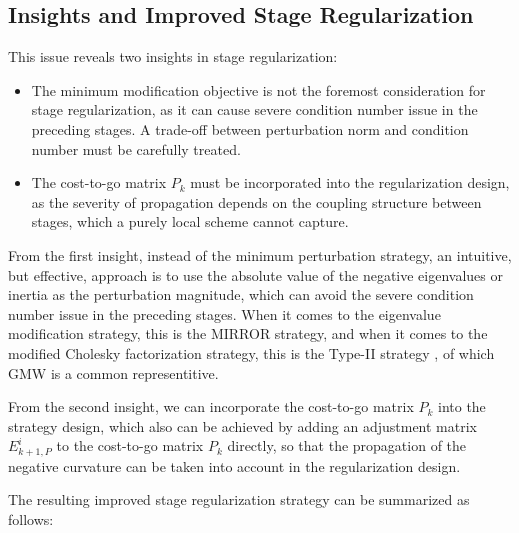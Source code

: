 \documentclass[class=scrbook, crop=false]{standalone}
\begin{document}
\subsection{Insights and Improved Stage Regularization}
This issue reveals two insights in stage regularization:
\begin{itemize}
    \item The minimum modification objective \cite{fangModifiedCholeskyAlgorithms2007} is not the foremost consideration for stage regularization, 
    as it can cause severe condition number issue in the preceding stages.
    A trade-off between perturbation norm and condition number must be carefully treated.
    \item The cost-to-go matrix $P_k$ must be incorporated into the regularization design, 
    as the severity of propagation depends on the coupling structure between stages, 
    which a purely local scheme cannot capture.
\end{itemize}

From the first insight, instead of the minimum perturbation strategy,
an intuitive, but effective, approach is to use the absolute value of the negative eigenvalues or inertia as the perturbation magnitude,
which can avoid the severe condition number issue in the preceding stages.
When it comes to the eigenvalue modification strategy, this is the MIRROR strategy,
and when it comes to the modified Cholesky factorization strategy, 
this is the Type-II strategy \cite{fangModifiedCholeskyAlgorithms2007}, of which GMW is a common representitive.

From the second insight, we can incorporate the cost-to-go matrix $P_k$ into the strategy design,
which also can be achieved by adding an adjustment matrix $E_{k+1,P}^i$ to the cost-to-go matrix $P_k$ directly,
so that the propagation of the negative curvature can be taken into account in the regularization design.

The resulting improved stage regularization strategy can be summarized as follows:
\end{document}
